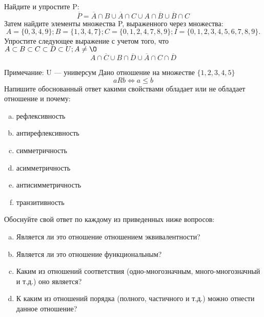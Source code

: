 \documentclass[10pt]{exam}
\begin{document}
\begin{questions}
\question
Найдите и упростите P:
\begin{equation*}
\overline{P} = \overline{A} \cap B \cup \overline{A} \cap C \cup A \cap \overline{B} \cup \overline{B} \cap C
\end{equation*}
Затем найдите элементы множества P, выраженного через множества:
\begin{equation*}
A = \{0, 3, 4, 9\}; 
B = \{1, 3, 4, 7\};
C = \{0, 1, 2, 4, 7, 8, 9\};
I = \{0, 1, 2, 3, 4, 5, 6, 7, 8, 9\}.
\end{equation*}\question
Упростите следующее выражение с учетом того, что $A\subset B \subset C \subset D \subset U; A \neq \O$
\begin{equation*}
A \cap  \overline{C} \cup B \cap \overline{D} \cup  \overline{A} \cap C \cap  \overline{D}
\end{equation*}

Примечание: U — универсум\question
Дано отношение на множестве $\{1, 2, 3, 4, 5\}$ 
\begin{equation*}
aRb \iff a \leq b
\end{equation*}
Напишите обоснованный ответ какими свойствами обладает или не обладает отношение и почему:   
\begin{enumerate} [a)]\setcounter{enumi}{0}
\item рефлексивность
\item антирефлексивность
\item симметричность
\item асимметричность
\item антисимметричность
\item транзитивность
\end{enumerate}

Обоснуйте свой ответ по каждому из приведенных ниже вопросов:
\begin{enumerate} [a)]\setcounter{enumi}{0}
    \item Является ли это отношение отношением эквивалентности?
    \item Является ли это отношение функциональным?
    \item Каким из отношений соответствия (одно-многозначным, много-многозначный и т.д.) оно является?
    \item К каким из отношений порядка (полного, частичного и т.д.) можно отнести данное отношение?
\end{enumerate}



\end{questions}
\end{document}
